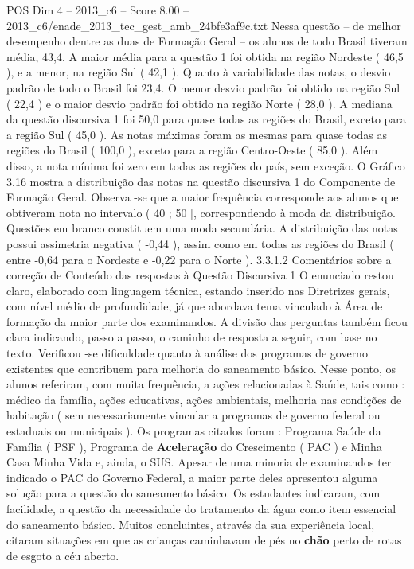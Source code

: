 \begin{textsample}{POS Dim 4 – 2013\_c6 – Score 8.00 – 2013\_c6/enade\_2013\_tec\_gest\_amb\_24bfe3af9c.txt}
Nessa questão – de melhor desempenho dentre as duas de Formação Geral – os alunos de todo Brasil tiveram média, 43,4.
A maior média para a questão 1 foi obtida na região Nordeste ( 46,5 ), e a menor, na região Sul ( 42,1 ).
Quanto à variabilidade das notas, o desvio padrão de todo o Brasil foi 23,4.
O menor desvio padrão foi obtido na região Sul ( 22,4 ) e o maior desvio padrão foi obtido na região Norte ( 28,0 ).
A mediana da questão discursiva 1 foi 50,0 para quase todas as regiões do Brasil, exceto para a região Sul ( 45,0 ).
As notas máximas foram as mesmas para quase todas as regiões do Brasil ( 100,0 ), exceto para a região Centro-Oeste ( 85,0 ).
Além disso, a nota mínima foi zero em todas as regiões do país, sem exceção.
O Gráfico 3.16 mostra a distribuição das notas na questão discursiva 1 do Componente de Formação Geral.
Observa -se que a maior frequência corresponde aos alunos que obtiveram nota no intervalo ( 40 ; 50 ], correspondendo à moda da distribuição.
Questões em branco constituem uma moda secundária.
A distribuição das notas possui assimetria negativa ( -0,44 ), assim como em todas as regiões do Brasil ( entre -0,64 para o Nordeste e -0,22 para o Norte ). 3.3.1.2 Comentários sobre a correção de Conteúdo das respostas à Questão Discursiva 1 O enunciado restou claro, elaborado com linguagem técnica, estando inserido nas Diretrizes gerais, com nível médio de profundidade, já que abordava tema vinculado à Área de formação da maior parte dos examinandos.
A divisão das perguntas também ficou clara indicando, passo a passo, o caminho de resposta a seguir, com base no texto.
Verificou -se dificuldade quanto à análise dos programas de governo existentes que contribuem para melhoria do saneamento básico.
Nesse ponto, os alunos referiram, com muita frequência, a ações relacionadas à Saúde, tais como : médico da família, ações educativas, ações ambientais, melhoria nas condições de habitação ( sem necessariamente vincular a programas de governo federal ou estaduais ou municipais ).
Os programas citados foram : Programa Saúde da Família ( PSF ), Programa de \textbf{Aceleração} do Crescimento ( PAC ) e Minha Casa Minha Vida e, ainda, o SUS.
Apesar de uma minoria de examinandos ter indicado o PAC do Governo Federal, a maior parte deles apresentou alguma solução para a questão do saneamento básico.
Os estudantes indicaram, com facilidade, a questão da necessidade do tratamento da água como item essencial do saneamento básico.
Muitos concluintes, através da sua experiência local, citaram situações em que as crianças caminhavam de pés no \textbf{chão} perto de rotas de esgoto a céu aberto.

\end{textsample}
